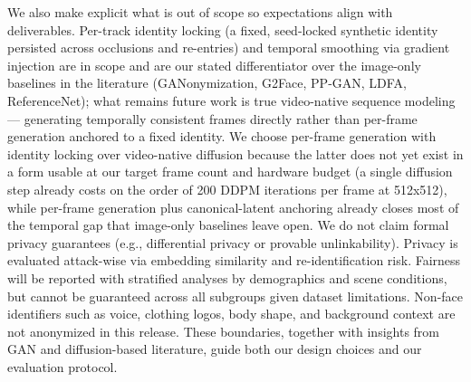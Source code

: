 \documentclass[12pt]{article}
\begin{document}
We also make explicit what is out of scope so expectations align with deliverables. Per-track identity locking (a fixed, seed-locked synthetic identity persisted across occlusions and re-entries) and temporal smoothing via gradient injection are in scope and are our stated differentiator over the image-only baselines in the literature (GANonymization, G2Face, PP-GAN, LDFA, ReferenceNet); what remains future work is true video-native sequence modeling — generating temporally consistent frames directly rather than per-frame generation anchored to a fixed identity. We choose per-frame generation with identity locking over video-native diffusion because the latter does not yet exist in a form usable at our target frame count and hardware budget (a single diffusion step already costs on the order of 200 DDPM iterations per frame at 512x512), while per-frame generation plus canonical-latent anchoring already closes most of the temporal gap that image-only baselines leave open. We do not claim formal privacy guarantees (e.g., differential privacy or provable unlinkability). Privacy is evaluated attack-wise via embedding similarity and re-identification risk. Fairness will be reported with stratified analyses by demographics and scene conditions, but cannot be guaranteed across all subgroups given dataset limitations. Non-face identifiers such as voice, clothing logos, body shape, and background context are not anonymized in this release. These boundaries, together with insights from GAN and diffusion-based literature, guide both our design choices and our evaluation protocol.



\end{document}

